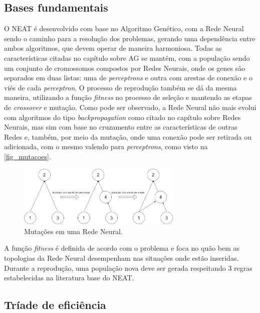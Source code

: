 \subsection{Bases fundamentais}

O NEAT é desenvolvido com base no Algoritmo Genético, com a Rede Neural 
sendo o caminho para a resolução dos problemas, gerando uma dependência entre 
ambos algoritmos, que devem operar de maneira harmoniosa. Todas as 
características citadas no capítulo sobre AG se mantêm, com a população sendo 
um conjunto de cromossomos compostos por Redes Neurais, onde os genes são 
separados em duas listas: uma de \textit{perceptrons} e outra com arestas de conexão e o 
viés de cada \textit{perceptron}. O processo de reprodução também se dá da mesma 
maneira, utilizando a função \textit{fitness} no processo de seleção e mantendo as etapas 
de \textit{crossover} e mutação. Como pode ser observado, a Rede Neural não mais evolui 
com algoritmos do tipo \textit{backpropagation} como citado no capítulo sobre Redes 
Neurais, mas sim com base no cruzamento entre as características de outras Redes 
e, também, por meio da mutação, onde uma conexão pode ser retirada 
ou adicionada, com o mesmo valendo para \textit{perceptrons}, como visto na \autoref{fig_mutacoes}.

\begin{figure}[htb]
        \centering
        \caption{\label{fig_mutacoes}Muta{\c c}{\~o}es em uma Rede Neural.}
        \includegraphics[width=0.7\textwidth]{images/MutaçãoDeTopologias.png}
\end{figure}

A função \textit{fitness} é definida de acordo com o problema e foca no quão bem as 
topologias da Rede Neural desempenham nas situações onde estão inseridas. 
Durante a reprodução, uma população nova deve ser gerada respeitando 3 regras 
estabelecidas na literatura base do NEAT.

\subsection{Tr{\'i}ade de efici{\^e}ncia}

